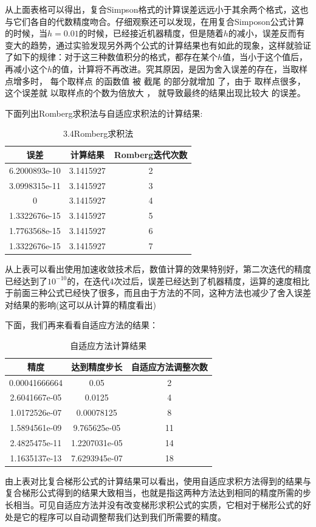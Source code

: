 \documentclass{ctexart}
\begin{document}
从上面表格可以得出，复合Simpson格式的计算误差远远小于其余两个格式，这也与它们各自的代数精度吻合。仔细观察还可以发现，在用复合Simposon公式计算的时候，当$h=0.01$的时候，已经接近机器精度，但是随着$h$的减小，误差反而有变大的趋势，通过实验发现另外两个公式的计算结果也有如此的现象，这样就验证了如下的规律：对于这三种数值积分的格式，都存在某个$h$值，当小于这个值后，再减小这个$h$的值，计算将不再改进。究其原因，是因为舍入误差的存在，当取样点增多时， 每个取样点 的函数值 被 截尾 的部分就增加 了，由于 取样点很多，这个误差就 以取样点的个数为倍放大 ， 就导致最终的结果出现比较大 的误差。

下面列出Romberg求积法与自适应求积法的计算结果:
\begin{center}
\begin{longtable}{|c|c|c|}
\caption{3.4Romberg求积法}\\
\hline
误差& 计算结果& Romberg迭代次数\\
\hline
6.2000893e-10& 3.1415927& 2\\
\hline
3.0998315e-11& 3.1415927& 3\\
\hline
0& 3.1415927& 4\\
\hline
1.3322676e-15& 3.1415927& 5\\
\hline
1.7763568e-15& 3.1415927& 6\\
\hline
1.3322676e-15& 3.1415927& 7\\
\hline
\end{longtable}
\end{center}
从上表可以看出使用加速收敛技术后，数值计算的效果特别好，第二次迭代的精度已经达到了$10^{-10}$的，在迭代4次过后，误差已经达到了机器精度，运算的速度相比于前面三种公式已经快了很多，而且由于方法的不同，这种方法也减少了舍入误差对结果的影响(这可以从计算的精度看出)

下面，我们再来看看自适应方法的结果：
\begin{center}
\begin{longtable}{|c|c|c|}
\caption{自适应方法计算结果}\\
\hline
精度& 达到精度步长& 自适应方法调整次数\\
\hline
0.00041666664& 0.05& 2\\
\hline
2.6041667e-05& 0.0125& 4\\
\hline
1.0172526e-07& 0.00078125& 8\\
\hline
1.5894561e-09& 9.765625e-05& 11\\
\hline
2.4825475e-11& 1.2207031e-05& 14\\
\hline
1.1635137e-13& 7.6293945e-07& 18\\
\hline
\end{longtable}
\end{center}
由上表对比复合梯形公式的计算结果可以看出，使用自适应求积方法得到的结果与复合梯形公式得到的结果大致相当，也就是指这两种方法达到相同的精度所需的步长相当。可见自适应方法并没有改变梯形求积公式的实质，它相对于梯形公式的好处是它的程序可以自动调整帮我们达到我们所需要的精度。
\end{document}
